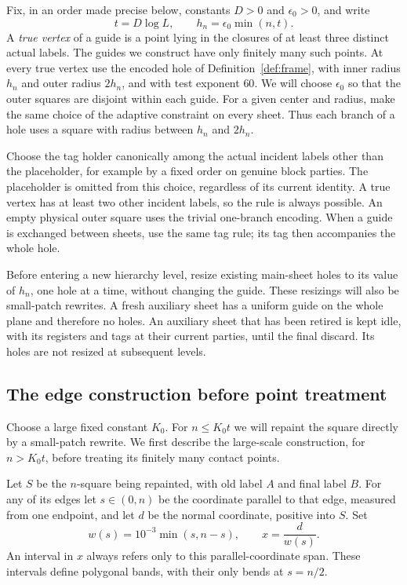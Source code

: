 \documentclass[11pt]{article}
\numberwithin{equation}{section}
\theoremstyle{definition}
\theoremstyle{remark}
\begin{document}
Fix, in an order made precise below, constants $D>0$ and
$\epsilon_0>0$, and write
\begin{equation}
 t=D\log L,
 \qquad h_n=\epsilon_0\min(n,t).
 \label{eq:geometry-scales}
\end{equation}
A \emph{true vertex} of a guide is a point lying in the closures of at
least three distinct actual labels.  The guides we construct have only
finitely many such points.  At every true vertex use the encoded hole
of Definition~\ref{def:frame}, with inner radius $h_n$ and outer radius
$2h_n$, and with test exponent $60$.  We will choose $\epsilon_0$ so
that the outer squares are disjoint within each guide.  For a given
center and radius, make the same choice of the adaptive constraint on
every sheet.  Thus each branch of a hole uses a square with radius
between $h_n$ and $2h_n$.

Choose the tag holder canonically among the actual incident labels
other than the placeholder, for example by a fixed order on genuine
block parties.  The placeholder is omitted from this choice, regardless
of its current identity.  A true vertex has at least two other incident
labels, so the rule is always possible.  An empty physical outer square
uses the trivial one-branch encoding.  When a guide is exchanged between
sheets, use the same tag rule; its tag then accompanies the whole hole.

Before entering a new hierarchy level, resize existing main-sheet holes
to its value of $h_n$, one hole at a time, without changing the guide.
These resizings will also be small-patch rewrites.  A fresh auxiliary
sheet has a uniform guide on the whole plane and therefore no holes.
An auxiliary sheet that has been retired is kept idle, with its
registers and tags at their current parties, until the final discard.
Its holes are not resized at subsequent levels.

\subsection{The edge construction before point treatment}

Choose a large fixed constant $K_0$.  For $n\le K_0t$ we will repaint
the square directly by a small-patch rewrite.  We first describe the
large-scale construction, for $n>K_0t$, before treating its finitely
many contact points.

Let $S$ be the $n$-square being repainted, with old label $A$ and final
label $B$.  For any of its edges let $s\in(0,n)$ be the coordinate
parallel to that edge, measured from one endpoint, and let $d$ be the
normal coordinate, positive into $S$.  Set
\begin{equation}
 w(s)=10^{-3}\min(s,n-s),
 \qquad x=\frac{d}{w(s)}.
 \label{eq:geometry-band}
\end{equation}
An interval in $x$ always refers only to this parallel-coordinate span.
These intervals define polygonal bands, with their only bends at
$s=n/2$.
\end{document}

